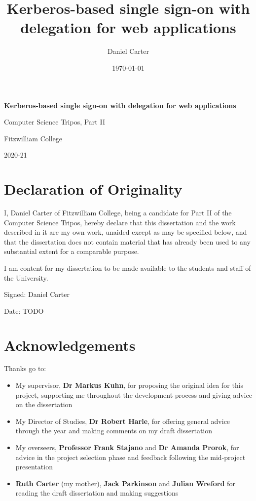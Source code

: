 \documentclass[12pt]{report}
\title{Kerberos-based single sign-on with delegation for web applications}
\author{Daniel Carter}
\date {\today}
\begin{document}

\begin{titlepage}
  \vfill
  \begin{center}
    \huge{
      \textbf{Kerberos-based single sign-on with delegation for web applications}

     Computer Science Tripos, Part II

     Fitzwilliam College

     2020-21
    }
  \end{center}
  \vfill
\end{titlepage}

\section*{Declaration of Originality}
I, Daniel Carter of Fitzwilliam College, being a candidate for Part II of the Computer Science Tripos, hereby declare that this dissertation and the work described in it are my own work, unaided except as may be specified below, and that the dissertation does not contain material that has already been used to any substantial extent for a comparable purpose.

I am content for my dissertation to be made available to the students and staff of the University.

Signed: Daniel Carter

Date: TODO

\section*{Acknowledgements}
Thanks go to:
\begin{itemize}
\item
  My supervisor, \textbf{Dr Markus Kuhn}, for proposing the original idea for this project, supporting me throughout the development process and giving advice on the dissertation
\item
  My Director of Studies, \textbf{Dr Robert Harle}, for offering general advice through the year and making comments on my draft dissertation
\item
  My overseers, \textbf{Professor Frank Stajano} and \textbf{Dr Amanda Prorok}, for advice in the project selection phase and feedback following the mid-project presentation
\item
  \textbf{Ruth Carter} (my mother), \textbf{Jack Parkinson} and \textbf{Julian Wreford} for reading the draft dissertation and making suggestions
\end{itemize}
\end{document}

